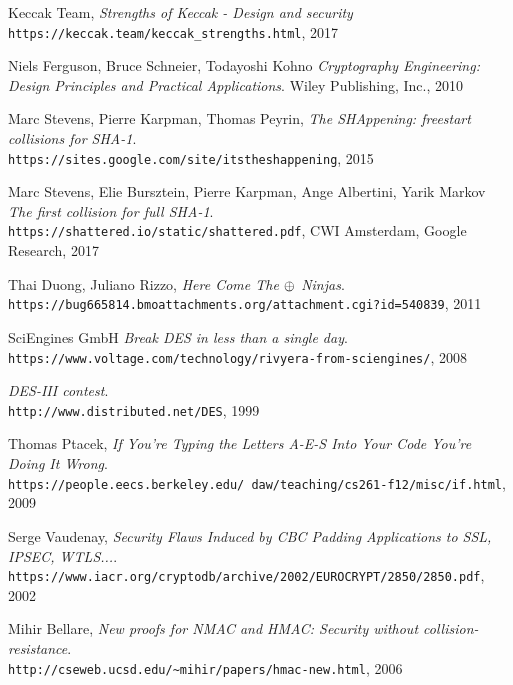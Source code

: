 \begin{thebibliography}{9}
Keccak Team,
\textit{Strengths of Keccak - Design and security} \\ 
\texttt{https://keccak.team/keccak\_strengths.html}, 2017

Niels Ferguson, Bruce Schneier, Todayoshi Kohno
\textit{Cryptography Engineering: Design Principles and Practical Applications}. Wiley Publishing, Inc., 2010

Marc Stevens, Pierre Karpman, Thomas Peyrin,
\textit{The SHAppening: freestart collisions for SHA-1}. \\
\texttt{https://sites.google.com/site/itstheshappening}, 2015

Marc Stevens, Elie Bursztein, Pierre Karpman, Ange Albertini, Yarik Markov
\textit{The first collision for full SHA-1}. \\
\texttt{https://shattered.io/static/shattered.pdf}, CWI Amsterdam, Google Research, 2017

Thai Duong, Juliano Rizzo, 
\textit{Here Come The $\mathbin{\oplus}$ Ninjas}. \\
\texttt{https://bug665814.bmoattachments.org/attachment.cgi?id=540839}, 2011

SciEngines GmbH
\textit{Break DES in less than a single day}. \\
\texttt{https://www.voltage.com/technology/rivyera-from-sciengines/}, 2008

\textit{DES-III contest}. \\
\texttt{http://www.distributed.net/DES}, 1999

Thomas Ptacek, 
\textit{If You’re Typing the Letters A-E-S Into Your Code You’re Doing It Wrong}. \\
\texttt{https://people.eecs.berkeley.edu/~daw/teaching/cs261-f12/misc/if.html}, 2009

Serge Vaudenay,
\textit{Security Flaws Induced by CBC Padding Applications to SSL, IPSEC, WTLS...}. \\
\texttt{https://www.iacr.org/cryptodb/archive/2002/EUROCRYPT/2850/2850.pdf}, 2002

Mihir Bellare,
\textit{New proofs for NMAC and HMAC: Security without collision-resistance}. \\
\texttt{http://cseweb.ucsd.edu/\textasciitilde mihir/papers/hmac-new.html}, 2006

\end{thebibliography}